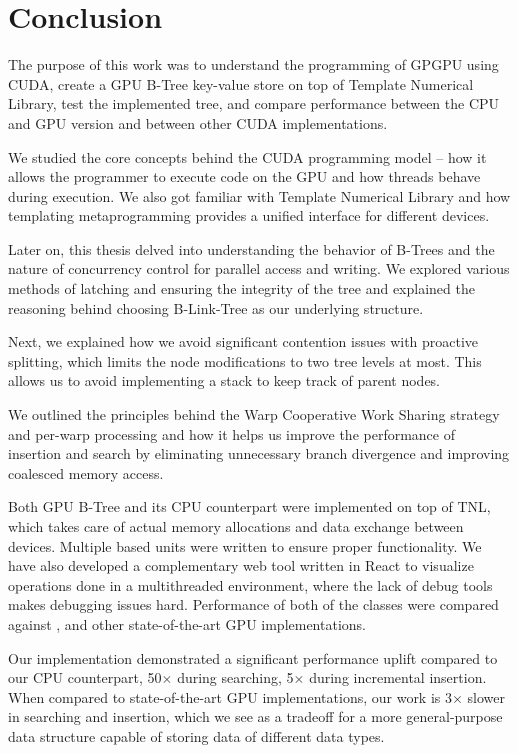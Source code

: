 \chapter{Conclusion}

The purpose of this work was to understand the programming of GPGPU using CUDA, create a GPU B-Tree key-value store on top of Template Numerical Library, test the implemented tree, and compare performance between the CPU and GPU version and between other CUDA implementations.

We studied the core concepts behind the CUDA programming model -- how it allows the programmer to execute code on the GPU and how threads behave during execution. We also got familiar with Template Numerical Library and how templating metaprogramming provides a unified interface for different devices.

Later on, this thesis delved into understanding the behavior of B-Trees and the nature of concurrency control for parallel access and writing. We explored various methods of latching and ensuring the integrity of the tree and explained the reasoning behind choosing B-Link-Tree as our underlying structure.

Next, we explained how we avoid significant contention issues with proactive splitting, which limits the node modifications to two tree levels at most. This allows us to avoid implementing a stack to keep track of parent nodes.

We outlined the principles behind the Warp Cooperative Work Sharing strategy and per-warp processing and how it helps us improve the performance of insertion and search by eliminating unnecessary branch divergence and improving coalesced memory access.

Both GPU B-Tree and its CPU counterpart were implemented on top of TNL, which takes care of actual memory allocations and data exchange between devices. Multiple  based units were written to ensure proper functionality. We have also developed a complementary web tool written in React to visualize operations done in a multithreaded environment, where the lack of debug tools makes debugging issues hard. Performance of both of the classes were compared against ,  and other state-of-the-art GPU implementations.

Our implementation demonstrated a significant performance uplift compared to our CPU counterpart, 50$\times$ during searching, 5$\times$ during incremental insertion. When compared to state-of-the-art GPU implementations, our work is 3$\times$ slower in searching and insertion, which we see as a tradeoff for a more general-purpose data structure capable of storing data of different data types.

